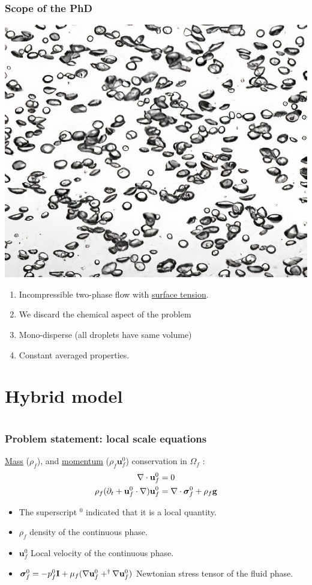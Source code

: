 \documentclass{sintefbeamer}
\begin{document}
\begin{frame}
  \frametitle{Scope of the PhD}
  \centering
  \includegraphics[height=0.3\textwidth]{image/bubbles_4x.jpg}

  \begin{enumerate}
    \item Incompressible two-phase flow with \underline{surface tension}. 
    \item We discard the chemical aspect of the problem 
    \item Mono-disperse (all droplets have same volume)
    \item Constant averaged properties.   
  \end{enumerate}
  
\end{frame}


\section{Hybrid model}
\section*{}



\begin{frame}
  \frametitle{Problem statement: local scale equations}
  \underline{Mass} ($\rho_f$), and \underline{momentum} ($\rho_f \textbf{u}_f^0$) conservation in $\Omega_f$ :
\begin{align}
  \mathbf{\nabla}\cdot  \textbf{u}_f^0
  &= 
  0
  \\
  \rho_f (\partial_t  + \textbf{u}_f^0 \cdot \mathbf{\nabla})
  \textbf{u}_f^0  
  &= 
  \mathbf{\nabla}\cdot  \bm{\sigma}_f^0 
  + \rho_f \textbf{g}
\end{align}
\begin{itemize}
    \item The superscript $^0$ indicated that it is a local quantity.
    \item $\rho_f$  density of the continuous phase. 
    \item $\textbf{u}_f^0$ Local velocity of the continuous phase.
    \item $\bm\sigma_f^0 = -p_f^0 \textbf{I} + \mu_f (\mathbf{\nabla} \textbf{u}_f^0+^\dagger\mathbf{\nabla} \textbf{u}_f^0)$ Newtonian stress tensor of the fluid phase. 
\end{itemize}
\end{frame}
\end{document}
